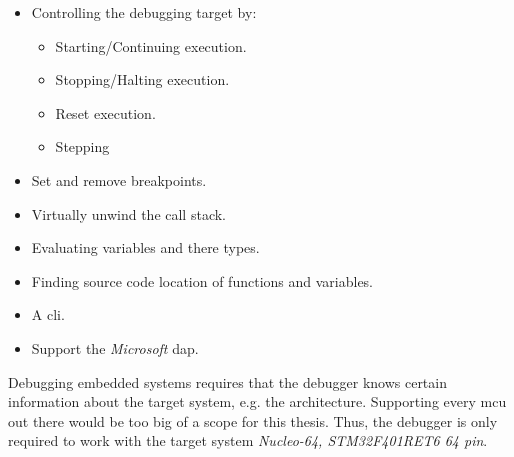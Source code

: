 \begin{itemize} \label{list:debuggerfeatures}
  \item Controlling the debugging target by:
  \begin{itemize}
    \item Starting/Continuing execution.
    \item Stopping/Halting execution.
    \item Reset execution.
    \item Stepping
  \end{itemize}
  \item Set and remove breakpoints.
  \item Virtually unwind the call stack.
  \item Evaluating variables and there types.
  \item Finding source code location of functions and variables.
  \item A \acrfull{cli}.
  \item Support the \emph{Microsoft} \acrfull{dap}.
\end{itemize}


Debugging embedded systems requires that the debugger knows certain information about the target system, e.g. the architecture.
Supporting every \gls{mcu} out there would be too big of a scope for this thesis.
Thus, the debugger is only required to work with the target system \emph{Nucleo-64, STM32F401RET6 64 pin}.

%



